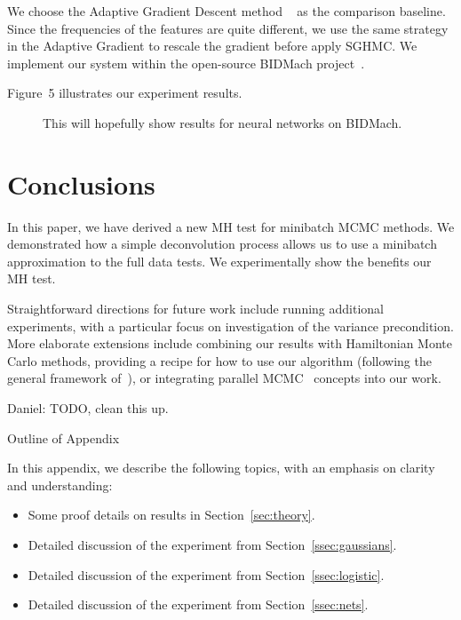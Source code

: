 \documentclass{article}
\begin{document}
We choose the Adaptive Gradient Descent method ~\cite{adapGrad} as the comparison baseline. Since the frequencies of the features are quite different, we use the same strategy in the Adaptive Gradient to rescale the gradient before apply SGHMC. We implement our system within the open-source BIDMach project~\cite{canny2013bidmach}.  

Figure~5 illustrates our experiment results.  
\begin{figure}[t]
    \centering
    \fbox{\rule[-.5cm]{0cm}{4cm} \rule[-.5cm]{4cm}{0cm}}
    \caption{This will hopefully show results for neural networks on BIDMach.}
\end{figure}




\section{Conclusions}\label{sec:conclusion}

In this paper, we have derived a new MH test for minibatch MCMC methods. We demonstrated how a
simple deconvolution process allows us to use a minibatch approximation to the full data tests. We
experimentally show the benefits our MH test.

Straightforward directions for future work include running additional experiments, with a particular
focus on investigation of the variance precondition.  More elaborate extensions include combining
our results with Hamiltonian Monte Carlo methods, providing a recipe for how to use our algorithm
(following the general framework of~\cite{sgmcmc_2015}), or integrating parallel
MCMC~\cite{conf/uai/AngelinoKWSA14,conf/icml/AhnSW14} concepts into our work.

{\color{blue}
Daniel: TODO, clean this up.
}

\small


\normalsize

\clearpage
\appendix

\begin{center}
{\Large Outline of Appendix}
\end{center}

In this appendix, we describe the following topics, with an emphasis on clarity and understanding:

\begin{itemize}[noitemsep]
    \item Some proof details on results in Section~\ref{sec:theory}.
    \item Detailed discussion of the experiment from Section~\ref{ssec:gaussians}.
    \item Detailed discussion of the experiment from Section~\ref{ssec:logistic}.
    \item Detailed discussion of the experiment from Section~\ref{ssec:nets}.
\end{itemize}
\end{document}
